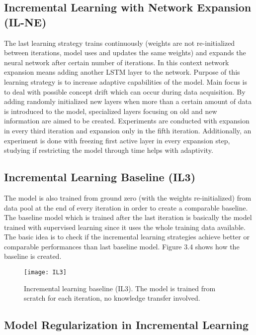 \subsection{Incremental Learning with Network Expansion (IL-NE)}

The last learning strategy trains continuously (weights are not re-initialized between iterations, model uses and updates the same weights) and expands the neural network after certain number of iterations. In this context network expansion means adding another LSTM layer to the network. Purpose of this learning strategy is to increase adaptive capabilities of the model. Main focus is to deal with possible concept drift which can occur during data acquisition. By adding randomly initialized new layers when more than a certain amount of data is introduced to the model, specialized layers focusing on old and new information are aimed to be created. Experiments are conducted with expansion in every third iteration and expansion only in the fifth iteration. Additionally, an experiment is done with freezing first active layer in every expansion step, studying if restricting the model through time helps with adaptivity.   

\subsection{Incremental Learning Baseline (IL3)}

The model is also trained from ground zero (with the weights re-initialized) from data pool at the end of every iteration in order to create a comparable baseline. The baseline model which is trained after the last iteration is basically the model trained with supervised learning since it uses the whole training data available. The basic idea is to check if the incremental learning strategies achieve better or comparable performances than last baseline model. Figure 3.4 shows how the baseline is created.

\begin{figure}[t]
\texttt{[image: IL3]}
\centering
\caption{Incremental learning baseline (IL3). The model is trained from scratch for each iteration, no knowledge transfer involved.}
\end{figure}

\subsection{Model Regularization in Incremental Learning}

